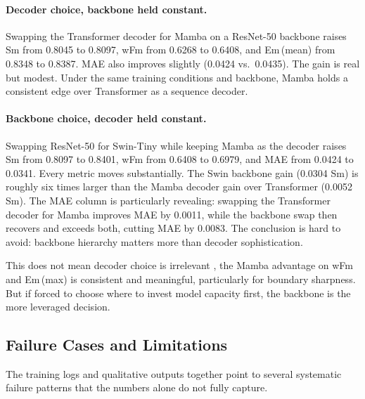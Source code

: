 \documentclass[10pt,conference]{IEEEtran}
\begin{document}
\paragraph{\textbf{Decoder choice, backbone held constant.}} Swapping the Transformer decoder for Mamba on a ResNet-50 backbone raises Sm from 0.8045 to 0.8097, wFm from 0.6268 to 0.6408, and Em\,(mean) from 0.8348 to 0.8387. MAE also improves slightly (0.0424 vs.\ 0.0435). The gain is real but modest. Under the same training conditions and backbone, Mamba holds a consistent edge over Transformer as a sequence decoder.

\paragraph{\textbf{Backbone choice, decoder held constant.}} Swapping ResNet-50 for Swin-Tiny while keeping Mamba as the decoder raises Sm from 0.8097 to 0.8401, wFm from 0.6408 to 0.6979, and MAE from 0.0424 to 0.0341. Every metric moves substantially. The Swin backbone gain (0.0304 Sm) is roughly six times larger than the Mamba decoder gain over Transformer (0.0052 Sm). The MAE column is particularly revealing: swapping the Transformer decoder for Mamba improves MAE by 0.0011, while the backbone swap then recovers and exceeds both, cutting MAE by 0.0083. The conclusion is hard to avoid: backbone hierarchy matters more than decoder sophistication.

This does not mean decoder choice is irrelevant , the Mamba advantage on wFm and Em\,(max) is consistent and meaningful, particularly for boundary sharpness. But if forced to choose where to invest model capacity first, the backbone is the more leveraged decision.

\subsection{Failure Cases and Limitations}

The training logs and qualitative outputs together point to several systematic failure patterns that the numbers alone do not fully capture.
\end{document}
